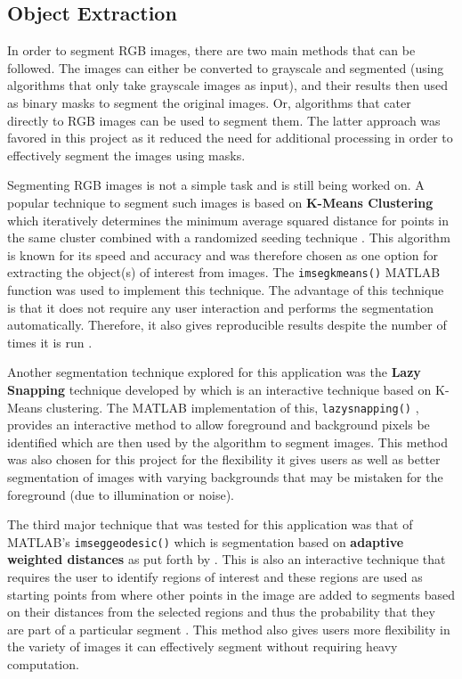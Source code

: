 \documentclass{article}
\begin{document}
\subsection{Object Extraction}
\label{sec:extraction}
In order to segment RGB images, there are two main methods that can be followed. The images can either be converted to grayscale and segmented (using algorithms that only take grayscale images as input), and their results then used as binary masks to segment the original images. Or, algorithms that cater directly to RGB images can be used to segment them. The latter approach was favored in this project as it reduced the need for additional processing in order to effectively segment the images using masks. 

Segmenting RGB images is not a simple task and is still being worked on. A popular technique to segment such images is based on \textbf{K-Means Clustering} which iteratively determines the minimum average squared distance for points in the same cluster combined with a randomized seeding technique \cite{arthur_k-means_nodate}. This algorithm is known for its speed and accuracy and was therefore chosen as one option for extracting the object(s) of interest from images. The \texttt{imsegkmeans()}\cite{noauthor_k-means_nodate} MATLAB function was used to implement this technique. The advantage of this technique is that it does not require any user interaction and performs the segmentation automatically. Therefore, it also gives reproducible results despite the number of times it is run \cite{noauthor_k-means_nodate}.

Another segmentation technique explored for this application was the \textbf{Lazy Snapping} technique developed by \cite{li_lazy_2004} which is an interactive technique based on K-Means clustering. The MATLAB implementation of this, \texttt{lazysnapping()} \cite{noauthor_segment_nodate}, provides an interactive method to allow foreground and background pixels be identified which are then used by the algorithm to segment images. This method was also chosen for this project for the flexibility it gives users as well as better segmentation of images with varying backgrounds that may be mistaken for the foreground (due to illumination or noise).

The third major technique that was tested for this application was that of MATLAB's \texttt{imseggeodesic()}\cite{noauthor_segment_nodate-1} which is segmentation based on \textbf{adaptive weighted distances} as put forth by \cite{protiere_interactive_2007}. This is also an interactive technique that requires the user to identify regions of interest and these regions are used as starting points from where other points in the image are added to segments based on their distances from the selected regions and thus the probability that they are part of a particular segment \cite{protiere_interactive_2007,noauthor_segment_nodate-1}. This method also gives users more flexibility in the variety of images it can effectively segment without requiring heavy computation. 
\end{document}
